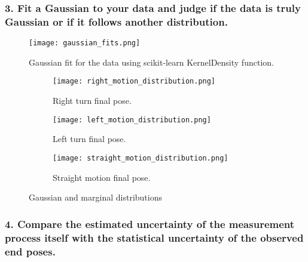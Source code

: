 \newpage
\subsubsection*{3. Fit a Gaussian to your data and judge if the data is truly Gaussian or if it follows another distribution.}

\begin{figure}[ht]
\centering
\texttt{[image: gaussian\_fits.png]}
\caption{Gaussian fit for the data using scikit-learn KernelDensity function. }
\label{gaussian}
\end{figure}


\begin{figure}[H]
\centering
\begin{subfigure}[b]{0.3\textwidth}
\texttt{[image: right\_motion\_distribution.png]}
\caption{Right turn final pose.}
\label{distribution-right-turn}
\end{subfigure}
\qquad
\begin{subfigure}[b]{0.3\textwidth}
\texttt{[image: left\_motion\_distribution.png]}
\caption{Left turn final pose.}
\label{distribution-right-turn}
\end{subfigure}
\qquad
\begin{subfigure}[b]{0.3\textwidth}
\texttt{[image: straight\_motion\_distribution.png]}
\caption{Straight motion final pose.}
\label{distribution-straight-motion}
\end{subfigure}
\caption{Gaussian and marginal distributions }
\end{figure}

\newpage
\subsubsection*{4. Compare the estimated uncertainty of the measurement process itself with the statistical uncertainty of the observed end poses.}

